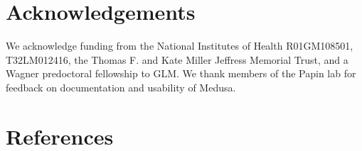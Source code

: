 \documentclass[11pt,twocolumn,notitlepage,openany,twoside]{book}
\begin{document}
\begin{refsection}
\section{Acknowledgements}

We acknowledge funding from the National Institutes of Health R01GM108501, T32LM012416, the Thomas F. and Kate Miller Jeffress Memorial Trust, and a Wagner predoctoral fellowship to GLM. We thank members of the Papin lab for feedback on documentation and usability of Medusa.

\section{References}

\printbibliography[heading=none]
\end{refsection}

\end{document}
